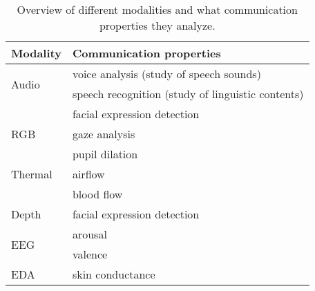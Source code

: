 \begin{table}[]
\centering
\caption{Overview of different modalities and what communication properties they analyze.}
\label{tab:modality}
\begin{tabular}{l|l}
\toprule
\textbf{Modality}      & \textbf{Communication properties}                 \\ \midrule
\multirow{2}{*}{Audio} & voice analysis (study of speech sounds)           \\
                       & speech recognition (study of linguistic contents) \\ \midrule
\multirow{3}{*}{RGB}   & facial expression detection                       \\
                       & gaze analysis                                     \\
                       & pupil dilation                                    \\ \midrule
Thermal                & airflow                                           \\
                       & blood flow                                        \\ \midrule
Depth                  & facial expression detection                       \\ \midrule
\multirow{2}{*}{EEG}   & arousal                                           \\
                       & valence                                           \\ \midrule
EDA                    & skin conductance                                 
\end{tabular}
\end{table}
















